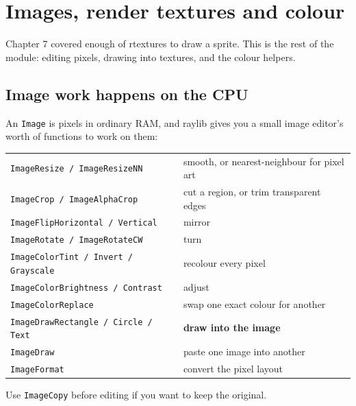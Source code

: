 \chapter{Images, render textures and colour}

Chapter 7 covered enough of rtextures to draw a sprite. This is the rest of the
module: editing pixels, drawing into textures, and the colour helpers.

\section{Image work happens on the CPU}

An \lstinline|Image| is pixels in ordinary RAM, and raylib gives you a small
image editor's worth of functions to work on them:

\begin{center}
\begin{tabular}{@{}ll@{}}
\toprule
\lstinline|ImageResize / ImageResizeNN| & smooth, or nearest-neighbour for pixel art \\
\lstinline|ImageCrop / ImageAlphaCrop| & cut a region, or trim transparent edges \\
\lstinline|ImageFlipHorizontal / Vertical| & mirror \\
\lstinline|ImageRotate / ImageRotateCW| & turn \\
\lstinline|ImageColorTint / Invert / Grayscale| & recolour every pixel \\
\lstinline|ImageColorBrightness / Contrast| & adjust \\
\lstinline|ImageColorReplace| & swap one exact colour for another \\
\lstinline|ImageDrawRectangle / Circle / Text| & \textbf{draw into the image} \\
\lstinline|ImageDraw| & paste one image into another \\
\lstinline|ImageFormat| & convert the pixel layout \\
\bottomrule
\end{tabular}
\end{center}


Use \lstinline|ImageCopy| before editing if you want to keep the original.

